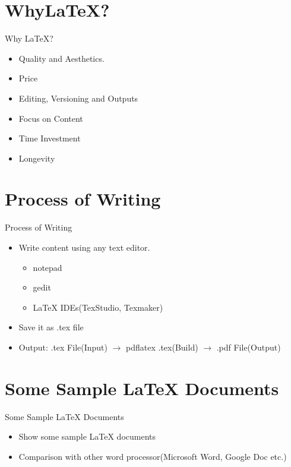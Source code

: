 \documentclass[dvipsnames, aspectratio=169]{beamer}
\begin{document}
	\section{Why{\LaTeX}?} 
	\begin{frame}[t]{Why {\LaTeX}?} \vspace{10pt} 
	\begin{itemize}
		\item Quality and Aesthetics.
		\item Price
		\item Editing, Versioning and Outputs
		\item Focus on Content
		\item Time Investment
		\item Longevity
	\end{itemize}
	\end{frame}


	\section{Process of Writing} 
	\begin{frame}[t]{Process of Writing}\vspace{10pt}
	\begin{itemize}
		\item Write content using any text editor.
		\begin{itemize}
			\item notepad
			\item gedit
			\item {\LaTeX} IDEs(TexStudio, Texmaker)
		\end{itemize}
		\item Save it as .tex file 
		\item Output: .tex File(Input) $\longrightarrow$  
		pdflatex .tex(Build) $\longrightarrow$  .pdf File(Output)
	\end{itemize}
	\end{frame}

	\section{Some Sample {\LaTeX} Documents} 
	\begin{frame}[t]{Some Sample {\LaTeX} Documents} \vspace{10pt}
		\begin{itemize}
			\item Show some sample {\LaTeX} documents
			\item Comparison with other word processor(Microsoft Word, Google 
			Doc etc.)
		\end{itemize}
	\end{frame}
\end{document}
